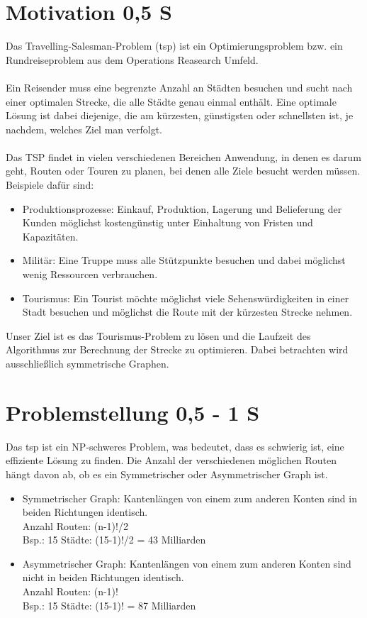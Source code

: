 \section{Motivation 0,5 S}
Das Travelling-Salesman-Problem (\acs*{tsp}) ist ein Optimierungsproblem bzw. ein Rundreiseproblem aus dem Operations Reasearch Umfeld.
\\\\
Ein Reisender muss eine begrenzte Anzahl an Städten besuchen und sucht nach einer optimalen Strecke, die alle Städte genau einmal enthält. 
Eine optimale Lösung ist dabei diejenige, die am kürzesten, günstigsten oder schnellsten ist, je nachdem, welches Ziel man verfolgt. \cite*{TravellingSalesmanProblemProblemHandlungsreisenden}
\\\\
Das TSP findet in vielen verschiedenen Bereichen Anwendung, in denen es darum geht, Routen oder Touren zu planen, bei denen alle Ziele besucht werden müssen. \\
Beispiele dafür sind:
\begin{itemize}
    \item Produktionsprozesse:
            Einkauf, Produktion, Lagerung und Belieferung der Kunden möglichst kostengünstig unter Einhaltung von Fristen und Kapazitäten.
    \item Militär:
            Eine Truppe muss alle Stützpunkte besuchen und dabei möglichst wenig Ressourcen verbrauchen. 
    \item Tourismus:
            Ein Tourist möchte möglichst viele Sehenswürdigkeiten in einer Stadt besuchen und möglichst die Route mit der kürzesten Strecke nehmen.
\end{itemize}

\noindent Unser Ziel ist es das Tourismus-Problem zu lösen und die Laufzeit des Algorithmus zur Berechnung der Strecke zu optimieren.
Dabei betrachten wird ausschließlich symmetrische Graphen.

\section{Problemstellung 0,5 - 1 S}
Das \acs*{tsp} ist ein NP-schweres Problem, was bedeutet, dass es schwierig ist, eine effiziente Lösung zu finden. 
Die Anzahl der verschiedenen möglichen Routen hängt davon ab, ob es ein Symmetrischer oder Asymmetrischer Graph ist.\cite*{gmbhTravelingSalesmanProblemOperationsResearch}

\begin{itemize}
    \item Symmetrischer Graph: Kantenlängen von einem zum anderen Konten sind in beiden Richtungen identisch.\\
            Anzahl Routen: (n-1)!/2\\
            Bsp.:   15 Städte: (15-1)!/2 = 43 Milliarden
    \item Asymmetrischer Graph: Kantenlängen von einem zum anderen Konten sind nicht in beiden Richtungen identisch.\\
            Anzahl Routen: (n-1)!\\
            Bsp.:   15 Städte: (15-1)! = 87 Milliarden
\end{itemize}

